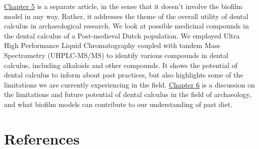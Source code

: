 \documentclass[
  letterpaper,
]{book}
\begin{document}
\protect\hyperlink{mb11CalculusPilot}{Chapter 5} is a separate article,
in the sense that it doesn't involve the biofilm model in any way.
Rather, it addresses the theme of the overall utility of dental calculus
in archaeological research. We look at possible medicinal compounds in
the dental calculus of a Post-medieval Dutch population. We employed
Ultra High Performance Liquid Chromatography coupled with tandem Mass
Spectrometry (UHPLC-MS/MS) to identify various compounds in dental
calculus, including alkaloids and other compounds. It shows the
potential of dental calculus to inform about past practices, but also
highlights some of the limitations we are currently experiencing in the
field. \protect\hyperlink{chap-discussion}{Chapter 6} is a discussion on
the limitations and future potential of dental calculus in the field of
archaeology, and what biofilm models can contribute to our understanding
of past diet.

\hypertarget{references}{%
\section*{References}\label{references}}

\end{document}
